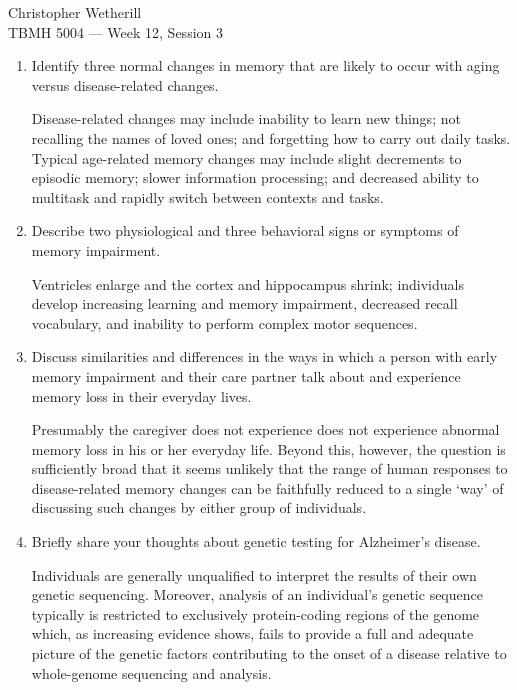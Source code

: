 \documentclass[11pt,letterpaper,final] {article}
\begin{document}

\noindent Christopher Wetherill\\
TBMH 5004 --- Week 12, Session 3

\begin{enumerate}
	\item Identify three normal changes in memory that are likely to occur with aging versus disease-related changes.
	
	Disease-related changes may include inability to learn new things; not recalling the names of loved ones; and forgetting how to carry out daily tasks. Typical age-related memory changes may include slight decrements to episodic memory; slower information processing; and decreased ability to multitask and rapidly switch between contexts and tasks.
	
	\item Describe two physiological and three behavioral signs or symptoms of memory impairment.
	
	Ventricles enlarge and the cortex and hippocampus shrink; individuals develop increasing learning and memory impairment, decreased recall vocabulary, and inability to perform complex motor sequences.

	\item Discuss similarities and differences in the ways in which a person with early memory impairment and their care partner talk about and experience memory loss in their everyday lives.
	
	Presumably the caregiver does not experience does not experience abnormal memory loss in his or her everyday life. Beyond this, however, the question is sufficiently broad that it seems unlikely that the range of human responses to disease-related memory changes can be faithfully reduced to a single `way' of discussing such changes by either group of individuals.
	
	\item Briefly share your thoughts about genetic testing for Alzheimer's disease.
	
	Individuals are generally unqualified to interpret the results of their own genetic sequencing. Moreover, analysis of an individual's genetic sequence typically is restricted to exclusively protein-coding regions of the genome which, as increasing evidence shows, fails to provide a full and adequate picture of the genetic factors contributing to the onset of a disease relative to whole-genome sequencing and analysis.
	
\end{enumerate}
\end{document}

